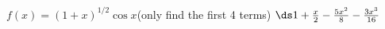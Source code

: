 {$f(x) = (1+x)^{1/2}\cos x$\quad (only find the first 4 terms)
}
{$\ds 1+\frac x2-\frac{5x^2}{8}-\frac{3x^3}{16}$
}